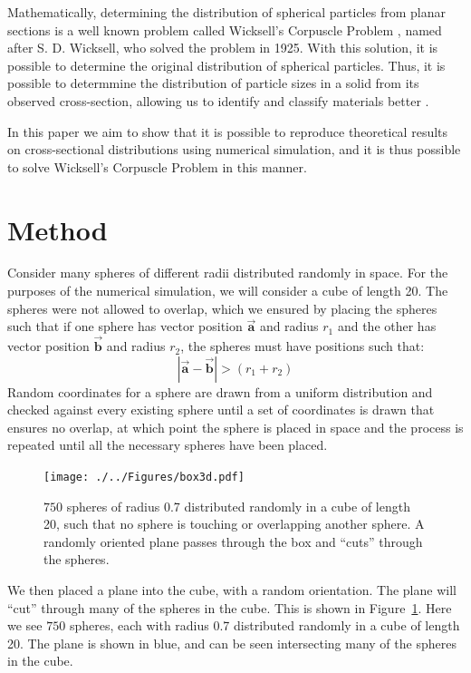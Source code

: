\documentclass[journal]{IEEEtran}
\begin{document}
Mathematically, determining the distribution of spherical particles from planar
sections is a well known problem called Wicksell's Corpuscle Problem
, named after S. D. Wicksell, who solved the problem in 1925. With
this solution, it is possible to determine the original distribution of
spherical particles. Thus, it is possible to determmine the distribution of
particle sizes in a solid from its observed cross-section, allowing us to
identify and classify materials better .

In this paper we aim to show that it is possible to reproduce theoretical
results on cross-sectional distributions using numerical simulation, and it is
thus possible to solve Wicksell's Corpuscle Problem in this manner.


\section{Method}

Consider many spheres of different radii distributed randomly in space. For the
purposes of the numerical simulation, we will consider a cube of length 20. The
spheres were not allowed to overlap, which we ensured by placing the spheres such
that if one sphere has vector position $\overrightarrow{\textbf{a}}$ and radius
$r_{1}$ and the other has vector position $\overrightarrow{\textbf{b}}$ and
radius $r_{2}$, the spheres must have positions such that:
\begin{equation*}
|\overrightarrow{\textbf{a}} - \overrightarrow{\textbf{b}}| > (r_{1} + r_{2})
\end{equation*}
Random coordinates for a sphere are drawn from a uniform distribution and
checked against every existing sphere until a set of coordinates is drawn that
ensures no overlap, at which point the sphere is placed in space and the process
is repeated until all the necessary spheres have been placed.

\begin{figure}%
\begin{center}
\texttt{[image: ./../Figures/box3d.pdf]}
\caption{$750$ spheres of radius 0.7 distributed randomly in a cube of length 20,
  such that no sphere is touching or overlapping another sphere. A randomly
  oriented plane passes through the box and ``cuts'' through the
  spheres.}\label{fig:3dplot_plane}
\end{center}
\end{figure}

We then placed a plane into the cube, with a random orientation. The plane will
``cut'' through many of the spheres in the cube. This is shown in
Figure~\ref{fig:3dplot_plane}. Here we see $750$ spheres, each with radius 0.7
distributed randomly in a cube of length 20. The plane is shown in blue, and can
be seen intersecting many of the spheres in the cube.
\end{document}
